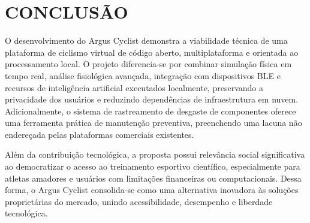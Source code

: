 \documentclass[
    a4paper,
    12pt,
    oneside,
    english,
    brazil,
    chapter=TITLE,
    section=TITLE,
]{abntex2}
\begin{document}
\chapter{CONCLUSÃO}
\label{sec:conclusao}

O desenvolvimento do Argus Cyclist demonstra a viabilidade técnica de uma plataforma de ciclismo virtual de código aberto, multiplataforma e orientada ao processamento local. O projeto diferencia-se por combinar simulação física em tempo real, análise fisiológica avançada, integração com dispositivos BLE e recursos de inteligência artificial executados localmente, preservando a privacidade dos usuários e reduzindo dependências de infraestrutura em nuvem. Adicionalmente, o sistema de rastreamento de desgaste de componentes oferece uma ferramenta prática de manutenção preventiva, preenchendo uma lacuna não endereçada pelas plataformas comerciais existentes.

Além da contribuição tecnológica, a proposta possui relevância social significativa ao democratizar o acesso ao treinamento esportivo científico, especialmente para atletas amadores e usuários com limitações financeiras ou computacionais. Dessa forma, o Argus Cyclist consolida-se como uma alternativa inovadora às soluções proprietárias do mercado, unindo acessibilidade, desempenho e liberdade tecnológica.

\postextual
\end{document}
